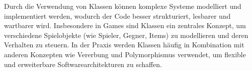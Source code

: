 Durch die Verwendung von Klassen können komplexe Systeme modelliert und implementiert werden, wodurch der Code besser strukturiert, lesbarer und wartbarer wird. Insbesondere in Games sind Klassen ein zentrales Konzept, um verschiedene Spielobjekte (wie Spieler, Gegner, Items) zu modellieren und deren Verhalten zu steuern. In der Praxis werden Klassen häufig in Kombination mit anderen Konzepten wie Vererbung und Polymorphismus verwendet, um flexible und erweiterbare Softwarearchitekturen zu schaffen.
